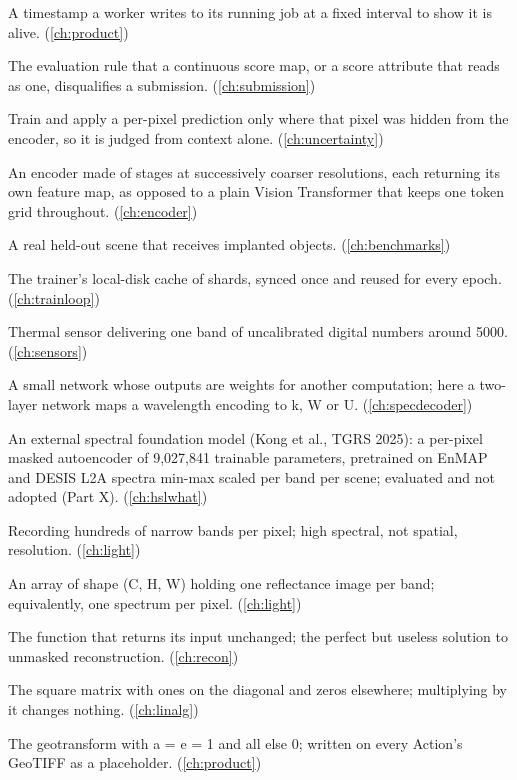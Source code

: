 \begin{description}[style=nextline,leftmargin=1.2em,font=\normalfont\bfseries]
\item[Heartbeat] A timestamp a worker writes to its running job at a fixed interval to show it is alive. (\cref{ch:product})
\item[Heatmap rule] The evaluation rule that a continuous score map, or a score attribute that reads as one, disqualifies a submission. (\cref{ch:submission})
\item[Hidden-pixel rule] Train and apply a per-pixel prediction only where that pixel was hidden from the encoder, so it is judged from context alone. (\cref{ch:uncertainty})
\item[Hierarchical encoder] An encoder made of stages at successively coarser resolutions, each returning its own feature map, as opposed to a plain Vision Transformer that keeps one token grid throughout. (\cref{ch:encoder})
\item[Host] A real held-out scene that receives implanted objects. (\cref{ch:benchmarks})
\item[Hot storage] The trainer's local-disk cache of shards, synced once and reused for every epoch. (\cref{ch:trainloop})
\item[HotSat-1] Thermal sensor delivering one band of uncalibrated digital numbers around 5000. (\cref{ch:sensors})
\item[Hypernetwork] A small network whose outputs are weights for another computation; here a two-layer network maps a wavelength encoding to k, W or U. (\cref{ch:specdecoder})
\item[HyperSL] An external spectral foundation model (Kong et al., TGRS 2025): a per-pixel masked autoencoder of 9,027,841 trainable parameters, pretrained on EnMAP and DESIS L2A spectra min-max scaled per band per scene; evaluated and not adopted (Part X). (\cref{ch:hslwhat})
\item[Hyperspectral] Recording hundreds of narrow bands per pixel; high spectral, not spatial, resolution. (\cref{ch:light})
\item[Hyperspectral cube] An array of shape (C, H, W) holding one reflectance image per band; equivalently, one spectrum per pixel. (\cref{ch:light})
\item[Identity function] The function that returns its input unchanged; the perfect but useless solution to unmasked reconstruction. (\cref{ch:recon})
\item[Identity matrix] The square matrix with ones on the diagonal and zeros elsewhere; multiplying by it changes nothing. (\cref{ch:linalg})
\item[Identity transform] The geotransform with a = e = 1 and all else 0; written on every Action's GeoTIFF as a placeholder. (\cref{ch:product})

\end{description}
